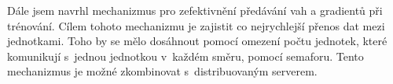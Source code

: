 Dále jsem navrhl mechanizmus pro zefektivnění předávání vah a gradientů při trénování.
Cílem tohoto mechanizmu je zajistit co nejrychlejší přenos dat mezi jednotkami.
Toho by se mělo dosáhnout pomocí omezení počtu jednotek, které komunikují s~jednou jednotkou v~každém směru, pomocí semaforu.
Tento mechanizmus je možné zkombinovat s~distribuovaným serverem.

